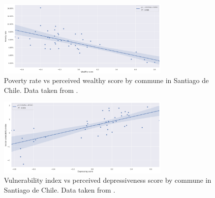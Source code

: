 \begin{figure}[ht]
	\begin{center}
	\includegraphics[width=0.75\textwidth]{./figures/poverty_rate.png}
	\caption[Poverty rate vs perceived wealthy score]{
		Poverty rate vs perceived wealthy score by commune in Santiago de Chile.
		Data taken from .
    }
	\label{fig:poverty}
	\end{center}
\end{figure}

\begin{figure}[ht]
	\begin{center}
	\includegraphics[width=0.75\textwidth]{./figures/vulnerability_index.png}
	\caption[Vulnerability index vs perceived depressiveness score]{
		Vulnerability index vs perceived depressiveness score by commune in Santiago de Chile.
		Data taken from .
    }
	\label{fig:vulnerability}
	\end{center}
\end{figure}